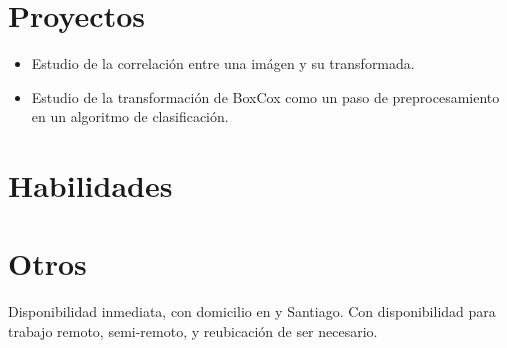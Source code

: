 \documentclass{my_cv}
\begin{document}
\section{Proyectos \faCogs}

\begin{itemize}
\item Estudio de la correlaci\'on entre una im\'agen y su transformada.
\item Estudio de la transformaci\'on de BoxCox como un paso de preprocesamiento en un algoritmo de clasificaci\'on.
\end{itemize}

\section{Habilidades \faBullseye}


\section{Otros \faPaperPlane}
Disponibilidad inmediata, con domicilio en {\valpo}  y Santiago. Con disponibilidad para trabajo remoto, semi-remoto, y reubicaci\'on de ser necesario. 

\end{document}
